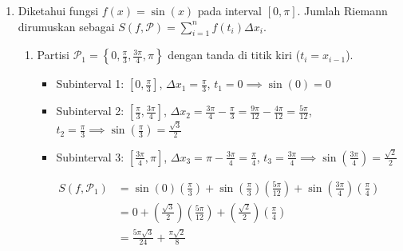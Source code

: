 \documentclass[11pt,letterpaper]{article}
\begin{document}
\begin{enumerate}
  \item Diketahui fungsi $f(x) = \sin(x)$ pada interval $[0,\pi]$. Jumlah Riemann dirumuskan sebagai $S(f, \mathcal{P}) = \sum_{i=1}^{n} f(t_i) \Delta x_i$.
        \begin{enumerate}[label=\alph*)]
          \item Partisi $\mathcal{P}_1 = \left\{0, \frac{\pi}{3}, \frac{3\pi}{4}, \pi\right\}$ dengan tanda di titik kiri ($t_i = x_{i-1}$).
                \begin{itemize}
                  \item Subinterval 1: $\left[0, \frac{\pi}{3}\right]$, $\Delta x_1 = \frac{\pi}{3}$, $t_1 = 0 \implies \sin(0) = 0$
                  \item Subinterval 2: $\left[\frac{\pi}{3}, \frac{3\pi}{4}\right]$, $\Delta x_2 = \frac{3\pi}{4} - \frac{\pi}{3} = \frac{9\pi}{12} - \frac{4\pi}{12} = \frac{5\pi}{12}$, $t_2 = \frac{\pi}{3} \implies \sin\left(\frac{\pi}{3}\right) = \frac{\sqrt{3}}{2}$
                  \item Subinterval 3: $\left[\frac{3\pi}{4}, \pi\right]$, $\Delta x_3 = \pi - \frac{3\pi}{4} = \frac{\pi}{4}$, $t_3 = \frac{3\pi}{4} \implies \sin\left(\frac{3\pi}{4}\right) = \frac{\sqrt{2}}{2}$
                \end{itemize}
                \begin{align*}
                  S(f, \mathcal{P}_1) & = \sin(0)\left(\frac{\pi}{3}\right) + \sin\left(\frac{\pi}{3}\right)\left(\frac{5\pi}{12}\right) + \sin\left(\frac{3\pi}{4}\right)\left(\frac{\pi}{4}\right) \\
                                      & = 0 + \left(\frac{\sqrt{3}}{2}\right)\left(\frac{5\pi}{12}\right) + \left(\frac{\sqrt{2}}{2}\right)\left(\frac{\pi}{4}\right)                                \\
                                      & = \frac{5\pi\sqrt{3}}{24} + \frac{\pi\sqrt{2}}{8}
                \end{align*}


\end{enumerate}
\end{enumerate}
\end{document}
